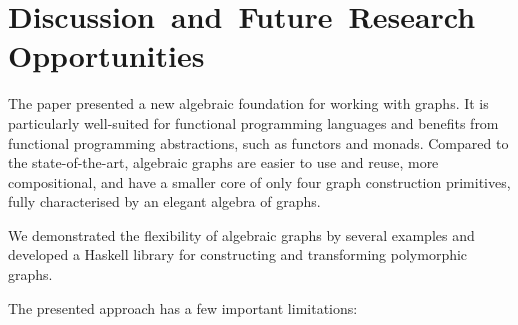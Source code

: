 \section{\hspace{-1mm}Discussion~and~Future~Research~Opportunities}\label{sec-discussion}

The paper presented a new algebraic foundation for working with graphs.
It is particularly well-suited for functional programming languages
and benefits from functional programming abstractions, such as functors and
monads. Compared to the state-of-the-art, algebraic graphs are easier to use and reuse,
more compositional, and have a smaller core of only four graph
construction primitives, fully characterised by an elegant algebra of graphs.

We demonstrated the flexibility of algebraic graphs by several examples and
developed a Haskell library for constructing and transforming polymorphic graphs.

The presented approach has a few important limitations:

